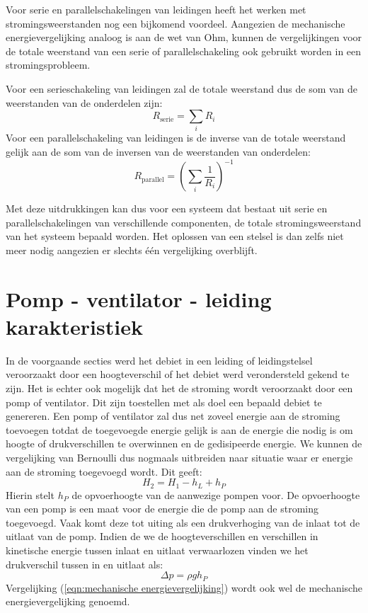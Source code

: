 Voor serie en parallelschakelingen van leidingen heeft het werken met stromingsweerstanden nog een bijkomend voordeel. Aangezien de mechanische energievergelijking analoog is aan de wet van Ohm, kunnen de vergelijkingen voor de totale weerstand van een serie of parallelschakeling ook gebruikt worden in een stromingsprobleem.

Voor een serieschakeling van leidingen zal de totale weerstand dus de som van de weerstanden van de onderdelen zijn:
\begin{equation}
	R_\mathrm{serie} = \sum_i R_i
\end{equation}
Voor een parallelschakeling van leidingen is de inverse van de totale weerstand gelijk aan de som van de inversen van de weerstanden van onderdelen:
\begin{equation}
	R_\mathrm{parallel} = \left( \sum_i \frac{1}{R_i} \right)^{-1}
\end{equation}

Met deze uitdrukkingen kan dus voor een systeem dat bestaat uit serie en parallelschakelingen van verschillende componenten, de totale stromingsweerstand van het systeem bepaald worden. Het oplossen van een stelsel is dan zelfs niet meer nodig aangezien er slechts één vergelijking overblijft.



	\section{Pomp - ventilator - leiding karakteristiek}
	\label{sec:Pomp - ventilator - leiding karakteristiek}
In de voorgaande secties werd het debiet in een leiding of leidingstelsel veroorzaakt door een hoogteverschil of het debiet werd verondersteld gekend te zijn. Het is echter ook mogelijk dat het de stroming wordt veroorzaakt door een pomp of ventilator. Dit zijn toestellen met als doel een bepaald debiet te genereren. Een pomp of ventilator zal dus net zoveel energie aan de stroming toevoegen totdat de toegevoegde energie gelijk is aan de energie die nodig is om hoogte of drukverschillen te overwinnen en de gedisipeerde energie. We kunnen de vergelijking van Bernoulli dus nogmaals uitbreiden naar situatie waar er energie aan de stroming toegevoegd wordt. Dit geeft: 
\begin{equation}
	H_2 = H_1 - h_L + h_P
	\label{eqn:mechanische energievergelijking}
\end{equation}
Hierin stelt $h_P$ de opvoerhoogte van de aanwezige pompen voor. De opvoerhoogte van een pomp is een maat voor de energie die de pomp aan de stroming toegevoegd. Vaak komt deze tot uiting als een drukverhoging van de inlaat tot de uitlaat van de pomp. Indien de we de hoogteverschillen en verschillen in kinetische energie tussen inlaat en uitlaat verwaarlozen vinden we het drukverschil tussen in en uitlaat als:
\begin{equation}
	\Delta p = \rho g h_P
\end{equation}
Vergelijking (\ref{eqn:mechanische energievergelijking}) wordt ook wel de mechanische energievergelijking genoemd.

